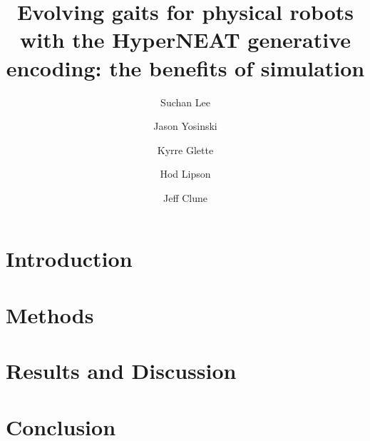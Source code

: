 \documentclass{llncs}
\begin{document}
%
\title{Evolving gaits for physical robots with the HyperNEAT generative encoding: the benefits of simulation}

\author{Suchan Lee \and Jason Yosinski \and Kyrre Glette \and Hod Lipson \and Jeff Clune }
\maketitle
%
%
%
%
\begin{abstract}

\end{abstract}
%
%


\section{Introduction}

%
%
\section{Methods}








%
%
\section{Results and Discussion}

%
%
\section{Conclusion}

%
%

%
\footnotesize


%
%
\end{document}
